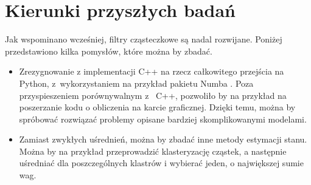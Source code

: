 \section{Kierunki przyszłych badań}
Jak wspominano wcześniej, filtry cząsteczkowe są nadal rozwijane. Poniżej przedstawiono kilka pomysłów, które można by zbadać.
\begin{itemize}
	\item Zrezygnowanie z implementacji C++ na rzecz całkowitego przejścia na Python, z~wykorzystaniem na przykład pakietu Numba \cite{numba}. Poza przyspieszeniem porównywalnym z~ C++, pozwoliło by na przykład na poszerzanie kodu o obliczenia na karcie graficznej. Dzięki temu, można by spróbować rozwiązać problemy opisane bardziej skomplikowanymi modelami.
	\item Zamiast zwykłych uśrednień, można by zbadać inne metody estymacji stanu. Można by na przykład przeprowadzić klasteryzację cząstek, a następnie uśredniać dla poszczególnych klastrów i wybierać jeden, o największej sumie wag.
\end{itemize}